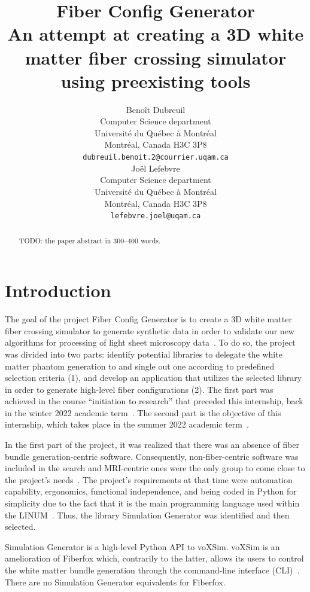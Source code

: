 \documentclass{article}
\title{
  Fiber Config Generator \\
  An attempt at creating a 3D white matter fiber crossing simulator using preexisting tools}
\author{
  Benoît Dubreuil \\
  Computer Science department \\
  Université du Québec à Montréal \\
  Montréal, Canada H3C 3P8 \\
  \texttt{dubreuil.benoit.2@courrier.uqam.ca} \\
  \And
  Joël Lefebvre \\
  Computer Science department\\
  Université du Québec à Montréal \\
  Montréal, Canada H3C 3P8\\
  \texttt{lefebvre.joel@uqam.ca} \\
}
\begin{document}
  \maketitle

  \begin{abstract}
    TODO: the paper abstract in 300--400 words.
  \end{abstract}


  \section{Introduction}\label{sec:introduction}

  The goal of the project Fiber Config Generator is to create a 3D white matter fiber crossing simulator to generate synthetic data in order to validate our new algorithms for processing of light sheet microscopy data~\cite{oliveirasicard2021orientation3d}.
  To do so, the project was divided into two parts: identify potential libraries to delegate the white matter phantom
  generation to and single out one according to predefined selection criteria (1), and develop an application that utilizes the selected library in order to generate high-level fiber configurations (2).
  The first part was achieved in the course ``initiation to research'' that preceded this internship, back in the winter 2022 academic term~\cite{dubreuil2022inf6200}.
  The second part is the objective of this internship, which takes place in the summer 2022 academic term~\cite{dubreuil2022inm5803simgenfork, dubreuil2022inm5803fiberconfiggen}.

  In the first part of the project, it was realized that there was an absence of fiber bundle generation-centric software.
  Consequently, non-fiber-centric software was included in the search and MRI-centric ones were the only group to come close to the project's needs~\cite{descoteauxvalcourtcaron2022othertoolsthanfiberfox}.
  The project's requirements at that time were automation capability, ergonomics, functional independence, and being coded in Python for simplicity due to the fact that it is the main programming language used within the LINUM~\cite{dubreuil2022inf6200}.
  Thus, the library Simulation Generator was identified and then selected.

  Simulation Generator is a high-level Python API to voXSim.
  voXSim is an amelioration of Fiberfox which, contrarily to the latter, allows its users to control the white matter
  bundle generation through the command-line interface (CLI)~\cite{valcourtcaron2022simulationgenerator, neher2014fiberfox}.
  There are no Simulation Generator equivalents for Fiberfox.
\end{document}

